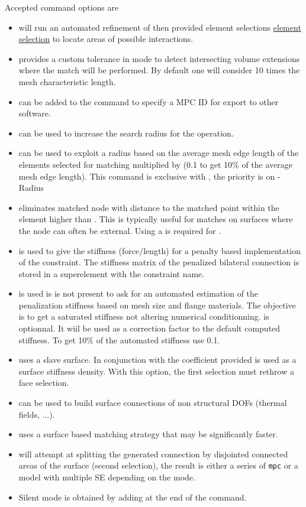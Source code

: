 \begin{SDT}
Accepted command options are 
\begin{itemize}
\item {} will run an automated refinement of then provided element selections \hyperlink{findelt}{element selection} to locate areas of possible interactions.
\item {} provides a custom tolerance in  mode to detect intersecting volume extensions where the match will be performed. By default one will consider 10 times the mesh characteristic length.
\item {} can be added to the command to specify a MPC ID {\ti {}} for export to other software. 
\item {} can be used to increase the search radius for the  operation.
\item {} can be used to exploit a radius based on the average mesh edge length of the elements selected for matching multiplied by  (0.1 to get 10\% of the average mesh edge length). This command is exclusive with , the priority is on {\ts -Radius}
\item {} eliminates matched node with distance to the matched point within the element higher than . This is typically useful for matches on surfaces where the node can often be external. Using a  is required for .
\item {} is used to give the stiffness (force/length) for a penalty based implementation of the constraint. The stiffness matrix of the penalized bilateral connection is stored in a superelement with the constraint name.
\item {} is used is  is not present to ask for an automated estimation of the penalization stiffness based on mesh size and flange materials. The objective is to get a saturated stiffness not altering numerical conditionning.  is optionnal. It wiil be used as a correction factor to the default computed stiffness. To get 10\% of the automated stiffness use 0.1.
\item {} uses  a slave surface. In conjunction with  the coefficient provided is used as a surface stiffness density. With this option, the first selection must rethrow a face selection.
\item {} can be used to build surface connections of non structural DOFs (thermal fields, ...).
\item {} uses a surface based matching strategy that may be significantly faster.
\item {} will attempt at splitting the generated connection by disjointed connected areas of the surface (second selection), the result is either a series of {\tt mpc} or a model with multiple SE depending on the mode.
\item Silent mode is obtained by adding \ts{;} at the end of the command.
\end{itemize}


\end{SDT}

